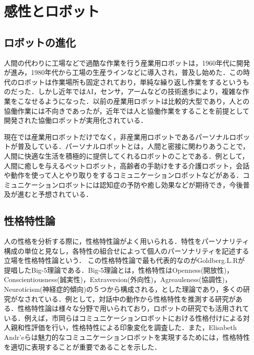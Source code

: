 \newpage

\section{感性とロボット}
\label{sec2.3}

\subsection{ロボットの進化}
\label{sec2.3.1}
人間の代わりに工場などで過酷な作業を行う産業用ロボットは，1960年代に開発が進み，1980年代から工場の生産ラインなどに導入され，普及し始めた．この時代のロボットは作業場所も固定されており，単純な繰り返し作業をするというものだった．しかし近年ではAI，センサ，アームなどの技術進歩により，複雑な作業をこなせるようになった．以前の産業用ロボットは比較的大型であり，人との協働作業には不向きであったが，近年では人と協働作業をすることを前提として開発された協働ロボットが実用化されている．

現在では産業用ロボットだけでなく，非産業用ロボットであるパーソナルロボットが普及している．パーソナルロボットとは，人間と密接に関わりあうことで，人間に快適な生活を積極的に提供してくれるロボットのことである．例として，人間に癒しを与えるペットロボット，高齢者の手助けをする介護ロボット，会話や動作を使って人とやり取りをするコミュニケーションロボットなどがある．コミュニケーションロボットには認知症の予防や癒し効果などが期待でき，今後普及が進むと予想されている．


\subsection{性格特性論}
\label{sec2.3.2}

人の性格を分析する際に，性格特性論がよく用いられる．特性をパーソナリティ構成の単位と見なし，各特性の組合せによって個人のパーソナリティを記述する立場を性格特性論という\cite{性格特性論}．
この性格特性論で最も代表的なのがGoldberg.L.Rが提唱したBig-5理論である．Big-5理論とは，性格特性はOpenness(開放性)，Conscientiousness(誠実性)，Extraversion(外向性)，Agreauleness(協調性)，Neuroticism(神経症的傾向)の５つから構成される，とした理論であり，多くの研究がなされている．例として，対話中の動作から性格特性を推測する研究がある\cite{性格特性推測}．性格特性論は様々な分野で用いられており，ロボットの研究でも活用されている．例えば，市岡らはコミュニケーションロボットにおける性格付けによる対人親和性評価を行い，性格特性による印象変化を調査した\cite{対人親和性}．また，Elisabeth Andr'eらは魅力的なコミュニケーションロボットを実現するためには，性格特性を適切に表現することが重要であることを示した\cite{ロボットの性格特性1}\cite{ロボットの性格特性2}\cite{ロボットの性格特性3}．


